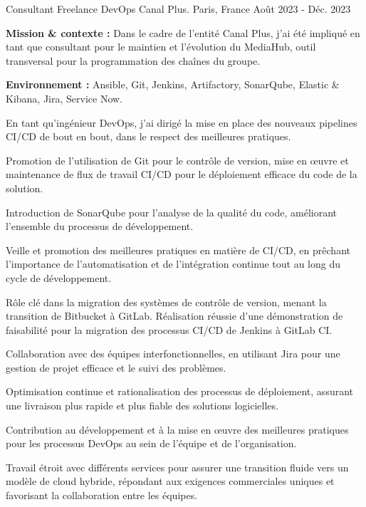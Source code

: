 \begin{cventries}
\cventry
{Consultant Freelance DevOps} %
{Canal Plus.} %
{Paris, France} %
{Août 2023 - Déc. 2023} %
{
  \begin{cvitems} %
    \item {\textbf{Mission \& contexte :} Dans le cadre de l'entité Canal Plus, j'ai été impliqué en tant que consultant pour le maintien et l'évolution du MediaHub, outil transversal pour la programmation des chaînes du groupe.}
    \item {\textbf{Environnement :} Ansible, Git, Jenkins, Artifactory, SonarQube, Elastic \& Kibana, Jira, Service Now.}
    \item {En tant qu'ingénieur DevOps, j'ai dirigé la mise en place des nouveaux pipelines CI/CD de bout en bout, dans le respect des meilleures pratiques.}
    \item {Promotion de l'utilisation de Git pour le contrôle de version, mise en œuvre et maintenance de flux de travail CI/CD pour le déploiement efficace du code de la solution.}
    \item {Introduction de SonarQube pour l'analyse de la qualité du code, améliorant l'ensemble du processus de développement.}
    \item {Veille et promotion des meilleures pratiques en matière de CI/CD, en prêchant l'importance de l'automatisation et de l'intégration continue tout au long du cycle de développement.}
    \item {Rôle clé dans la migration des systèmes de contrôle de version, menant la transition de Bitbucket à GitLab. Réalisation réussie d'une démonstration de faisabilité pour la migration des processus CI/CD de Jenkins à GitLab CI.}
    \item {Collaboration avec des équipes interfonctionnelles, en utilisant Jira pour une gestion de projet efficace et le suivi des problèmes.}
    \item {Optimisation continue et rationalisation des processus de déploiement, assurant une livraison plus rapide et plus fiable des solutions logicielles.}
    \item {Contribution au développement et à la mise en œuvre des meilleures pratiques pour les processus DevOps au sein de l'équipe et de l'organisation.}
    \item {Travail étroit avec différents services pour assurer une transition fluide vers un modèle de cloud hybride, répondant aux exigences commerciales uniques et favorisant la collaboration entre les équipes.}
  \end{cvitems}        
}


\end{cventries}
